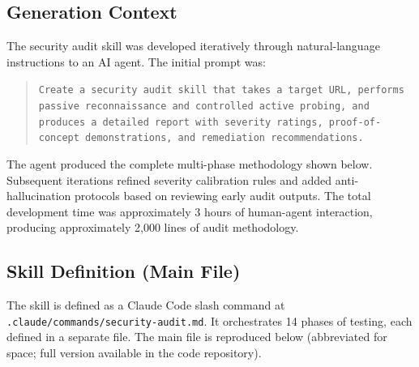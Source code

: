 \documentclass[10pt]{article}
\begin{document}
\subsection{Generation Context}

The security audit skill was developed iteratively through natural-language instructions to an AI agent. The initial prompt was:

\begin{quote}
\texttt{Create a security audit skill that takes a target URL, performs passive reconnaissance and controlled active probing, and produces a detailed report with severity ratings, proof-of-concept demonstrations, and remediation recommendations.}
\end{quote}

The agent produced the complete multi-phase methodology shown below. Subsequent iterations refined severity calibration rules and added anti-hallucination protocols based on reviewing early audit outputs. The total development time was approximately 3 hours of human-agent interaction, producing approximately 2,000 lines of audit methodology.

\subsection{Skill Definition (Main File)}

The skill is defined as a Claude Code slash command at \texttt{.claude/commands/security-audit.md}. It orchestrates 14 phases of testing, each defined in a separate file. The main file is reproduced below (abbreviated for space; full version available in the code repository).
\end{document}
